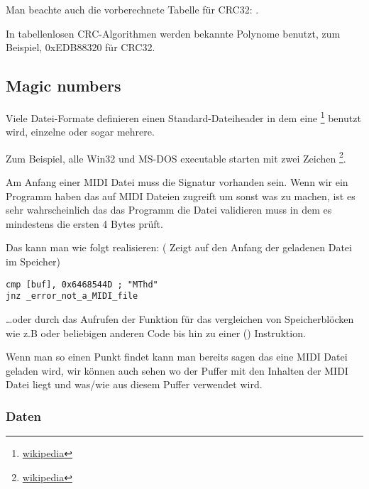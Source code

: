 Man beachte auch die vorberechnete Tabelle f\"ur CRC32: .

In tabellenlosen CRC-Algorithmen werden bekannte Polynome benutzt, zum Beispiel, 0xEDB88320 f\"ur CRC32.

\subsection{Magic numbers}
\label{magic_numbers}

\newcommand{\FNURLMAGIC}{\footnote{\href{http://go.yurichev.com/17112}{wikipedia}}}

Viele Datei-Formate definieren einen Standard-Dateiheader in dem eine \FNURLMAGIC{} benutzt wird, einzelne oder sogar mehrere. 


Zum Beispiel, alle Win32 und MS-DOS executable starten mit zwei Zeichen \footnote{\href{http://go.yurichev.com/17113}{wikipedia}}.



Am Anfang einer MIDI Datei muss die  Signatur vorhanden sein.
Wenn wir ein Programm haben das auf MIDI Dateien zugreift um sonst was zu machen,
ist es sehr wahrscheinlich das das Programm die Datei validieren muss in dem es
mindestens die ersten 4 Bytes pr\"uft.

Das kann man wie folgt realisieren:
( Zeigt auf den Anfang der geladenen Datei im Speicher) 

\begin{lstlisting}[style=customasmx86]
cmp [buf], 0x6468544D ; "MThd"
jnz _error_not_a_MIDI_file
\end{lstlisting}


\dots oder durch das Aufrufen der Funktion f\"ur das vergleichen von Speicherbl\"ocken wie z.B  oder 
beliebigen anderen Code bis hin zu einer  () Instruktion.

Wenn man so einen Punkt findet kann man bereits sagen das eine MIDI Datei geladen wird, %
wir k\"onnen auch sehen wo der Puffer mit den Inhalten der MIDI Datei liegt und was/wie aus diesem
Puffer verwendet wird.

\subsubsection{Daten}

